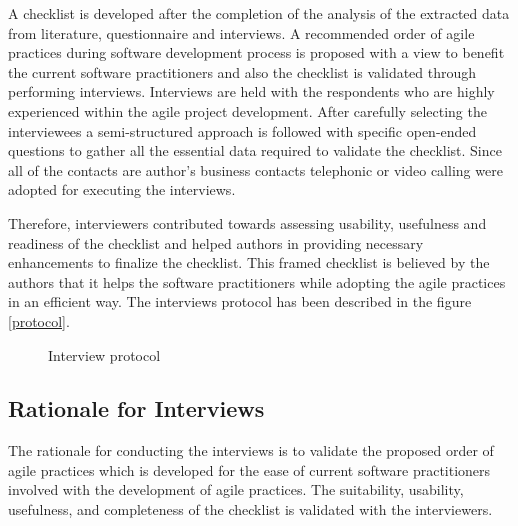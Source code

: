 \documentclass[a4paper,oneside]{bth}
\begin{document}
A checklist is developed after the completion of the analysis of the extracted data from literature, questionnaire and interviews. A recommended order of agile practices during software development process is proposed with a view to benefit the current software practitioners and also the checklist is validated through performing interviews. Interviews are held with the respondents who are highly experienced within the agile project development. After carefully selecting the interviewees a semi-structured approach is followed with specific open-ended questions to gather all the essential data required to validate the checklist. Since all of the contacts are author’s business contacts telephonic or video calling were adopted for executing the interviews.

Therefore, interviewers contributed towards assessing usability, usefulness and readiness of the checklist and helped authors in providing necessary enhancements to finalize the checklist. This framed checklist is believed by the authors that it helps the software practitioners while adopting the agile practices in an efficient way. The interviews protocol has been described in the figure \ref{protocol}.
\begin{figure}[h]
\centering

\caption{Interview protocol}
\label{Interview protocol}
\end{figure}
\subsection{Rationale for Interviews}
The rationale for conducting the interviews is to validate the proposed order of agile practices which is developed for the ease of current software practitioners involved with the development of agile practices. The suitability, usability, usefulness, and completeness of the checklist is validated with the interviewers.
\end{document}
